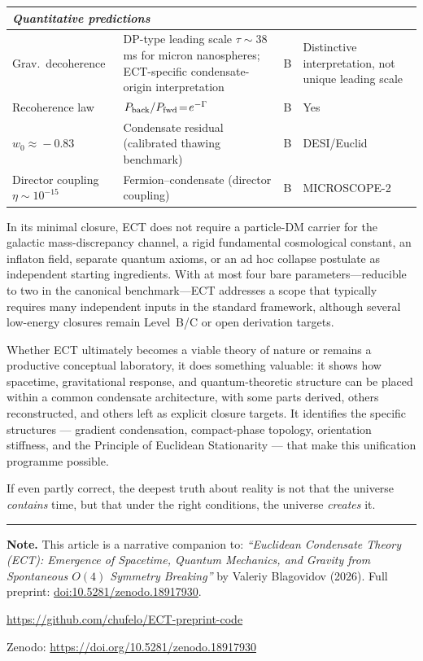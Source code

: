 \documentclass[11pt,a4paper]{article}
\begin{document}
\begin{table}[H]
\begin{tabular}{@{}p{3.8cm}p{4.5cm}cp{2.2cm}@{}}
\midrule
\multicolumn{4}{l}{\textit{Quantitative predictions}} \\
\midrule
Grav.\ decoherence & DP-type leading scale $\tau\!\sim\!38$\,ms for micron nanospheres; ECT-specific condensate-origin interpretation & B & Distinctive interpretation, not unique leading scale \\
Recoherence law & $P_{\rm back}/P_{\rm fwd}\!=\!e^{-\Gamma}$ & B & Yes \\
$w_0\!\approx\!-0.83$ & Condensate residual (calibrated thawing benchmark) & B & DESI/Euclid \\
Director coupling $\eta\!\sim\!10^{-15}$ & Fermion--condensate (director coupling) & B & MICROSCOPE-2 \\
\bottomrule
\end{tabular}
\end{table}

In its minimal closure, ECT does not require a particle-DM carrier for the galactic mass-discrepancy channel, a rigid fundamental cosmological constant, an inflaton field, separate quantum axioms, or an ad hoc collapse postulate as independent starting ingredients. With at most four bare parameters---reducible to two in the canonical benchmark---ECT addresses a scope that typically requires many independent inputs in the standard framework, although several low-energy closures remain Level~B/C or open derivation targets.

Whether ECT ultimately becomes a viable theory of nature or remains a productive conceptual laboratory, it does something valuable: it shows how spacetime, gravitational response, and quantum-theoretic structure can be placed within a common condensate architecture, with some parts derived, others reconstructed, and others left as explicit closure targets. It identifies the specific structures --- gradient condensation, compact-phase topology, orientation stiffness, and the Principle of Euclidean Stationarity --- that make this unification programme possible.

If even partly correct, the deepest truth about reality is not that the universe \emph{contains} time, but that under the right conditions, the universe \emph{creates} it.

\vspace{2em}
\noindent\rule{\textwidth}{0.5pt}

\noindent\textbf{Note.}
This article is a narrative companion to:
\emph{``Euclidean Condensate Theory (ECT): Emergence of Spacetime,
Quantum Mechanics, and Gravity from Spontaneous $O(4)$ Symmetry
Breaking''} by Valeriy Blagovidov (2026).
Full preprint: \href{https://doi.org/10.5281/zenodo.18917930}{doi:10.5281/zenodo.18917930}.

\medskip
\centerline{\url{https://github.com/chufelo/ECT-preprint-code}}
\medskip
\centerline{Zenodo: \url{https://doi.org/10.5281/zenodo.18917930}}
\end{document}
